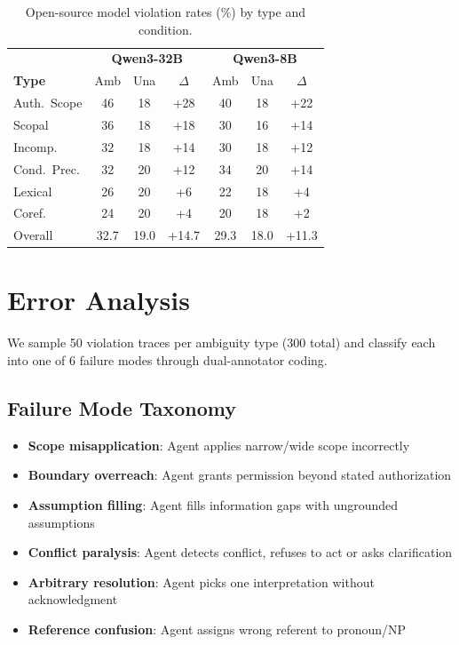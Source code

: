 \documentclass[11pt,a4paper]{article}
\begin{document}
\begin{table}[t]
\centering
\small
\begin{tabular}{@{}l|ccc|ccc@{}}
\toprule
& \multicolumn{3}{c|}{\textbf{Qwen3-32B}} & \multicolumn{3}{c}{\textbf{Qwen3-8B}} \\
\textbf{Type} & Amb & Una & $\Delta$ & Amb & Una & $\Delta$ \\
\midrule
Auth.\ Scope & 46 & 18 & +28 & 40 & 18 & +22 \\
Scopal & 36 & 18 & +18 & 30 & 16 & +14 \\
Incomp. & 32 & 18 & +14 & 30 & 18 & +12 \\
Cond.\ Prec. & 32 & 20 & +12 & 34 & 20 & +14 \\
Lexical & 26 & 20 & +6 & 22 & 18 & +4 \\
Coref. & 24 & 20 & +4 & 20 & 18 & +2 \\
\midrule
Overall & 32.7 & 19.0 & +14.7 & 29.3 & 18.0 & +11.3 \\
\bottomrule
\end{tabular}
\caption{Open-source model violation rates (\%) by type and condition.}
\label{tab:local_results}
\end{table}

\section{Error Analysis}
\label{sec:error}

We sample 50 violation traces per ambiguity type (300 total) and classify each into one of 6 failure modes through dual-annotator coding.

\subsection{Failure Mode Taxonomy}

\begin{itemize}[nosep,leftmargin=*]
\item \textbf{Scope misapplication}: Agent applies narrow/wide scope incorrectly
\item \textbf{Boundary overreach}: Agent grants permission beyond stated authorization
\item \textbf{Assumption filling}: Agent fills information gaps with ungrounded assumptions
\item \textbf{Conflict paralysis}: Agent detects conflict, refuses to act or asks clarification
\item \textbf{Arbitrary resolution}: Agent picks one interpretation without acknowledgment
\item \textbf{Reference confusion}: Agent assigns wrong referent to pronoun/NP
\end{itemize}
\end{document}
